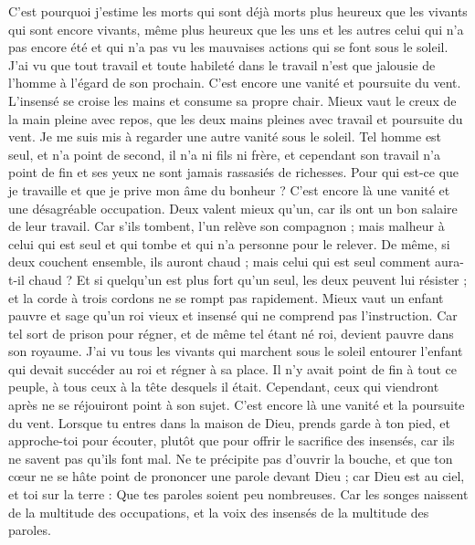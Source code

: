 \begin{multicols}{2}
C'est pourquoi j'estime les morts qui sont déjà morts plus heureux que les vivants qui sont encore vivants,
même plus heureux que les uns et les autres celui qui n'a pas encore été et qui n'a pas vu les mauvaises actions qui se font sous le soleil.
J'ai vu que tout travail et toute habileté dans le travail n'est que jalousie de l'homme à l'égard de son prochain. C'est encore une vanité et poursuite du vent.
L'insensé se croise les mains et consume sa propre chair.
Mieux vaut le creux de la main pleine avec repos, que les deux mains pleines avec travail et poursuite du vent.
Je me suis mis à regarder une autre vanité sous le soleil.
Tel homme est seul, et n'a point de second, il n'a ni fils ni frère, et cependant son travail n'a point de fin et ses yeux ne sont jamais rassasiés de richesses. Pour qui est-ce que je travaille et que je prive mon âme du bonheur ? C'est encore là une vanité et une désagréable occupation.
Deux valent mieux qu'un, car ils ont un bon salaire de leur travail.
Car s'ils tombent, l'un relève son compagnon ; mais malheur à celui qui est seul et qui tombe et qui n'a personne pour le relever.
De même, si deux couchent ensemble, ils auront chaud ; mais celui qui est seul comment aura-t-il chaud ?
Et si quelqu'un est plus fort qu'un seul, les deux peuvent lui résister ; et la corde à trois cordons ne se rompt pas rapidement.
Mieux vaut un enfant pauvre et sage qu'un roi vieux et insensé qui ne comprend pas l'instruction.
Car tel sort de prison pour régner, et de même tel étant né roi, devient pauvre dans son royaume.
J'ai vu tous les vivants qui marchent sous le soleil entourer l'enfant qui devait succéder au roi et régner à sa place.
Il n'y avait point de fin à tout ce peuple, à tous ceux à la tête desquels il était. Cependant, ceux qui viendront après ne se réjouiront point à son sujet. C'est encore là une vanité et la poursuite du vent.
Lorsque tu entres dans la maison de Dieu, prends garde à ton pied, et approche-toi pour écouter, plutôt que pour offrir le sacrifice des insensés, car ils ne savent pas qu'ils font mal.
\VerseOne{}Ne te précipite pas d'ouvrir la bouche, et que ton cœur ne se hâte point de prononcer une parole devant Dieu ; car Dieu est au ciel, et toi sur la terre : Que tes paroles soient peu nombreuses.
Car les songes naissent de la multitude des occupations, et la voix des insensés de la multitude des paroles.

\end{multicols}
